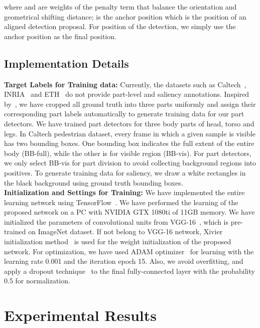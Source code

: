 \documentclass[journal]{IEEEtran}
\begin{document}
where  and  are weights of the penalty term that balance the orientation and geometrical shifting distance;  is the anchor position which is the position of an aligned detection proposal. For position of the detection, we simply use the anchor position as the final position.

\subsection{Implementation Details}
\label{subsec:Implementation}
\textbf{Target Labels for Training data:} Currently, the datasets such as Caltech~\cite{Dollar2012PAMI}, INRIA~\cite{dalal2005histograms} and ETH~\cite{eth_biwi_00534} do not provide part-level and saliency annotations. Inspired by~\cite{felzenszwalb2008a,felzenszwalb2010object}, we have cropped all ground truth into three parts uniformly and assign their corresponding part labels automatically to generate training data for our part detectors. We have trained part detectors for three body parts of head, torso and legs. In Caltech pedestrian dataset, every frame in which a given sample is visible has two bounding boxes. One bounding box indicates the full extent of the entire body (BB-full), while the other is for visible region (BB-vis). For part detectors, we only select BB-vis for part division to avoid collecting background regions into positives. To generate training data for saliency, we draw a white rectangles in the black background using ground truth bounding boxes. \\

\textbf{Initialization and Settings for Training:} We have implemented the entire learning network using TensorFlow~\cite{tensorflow16tensorflow}. We have performed the learning of the proposed network on a PC with NVIDIA GTX 1080ti of 11GB memory. We have initialized the parameters of convolutional units from VGG-16~\cite{simonyan2014very}, which is pre-trained on ImageNet dataset. If not belong to VGG-16 network, Xivier initialization method~\cite{Xavier10init} is used for the weight initialization of the proposed network. For optimization, we have used ADAM optimizer~\cite{KingmaB14Adam} for learning with the learning rate 0.001 and the iteration epoch 15. Also, we avoid overfitting, and apply a dropout technique~\cite{srivastava14dropout} to the final fully-connected layer with the probability 0.5 for normalization.

\section{Experimental Results}
\label{sec:Experiments}
\end{document}
